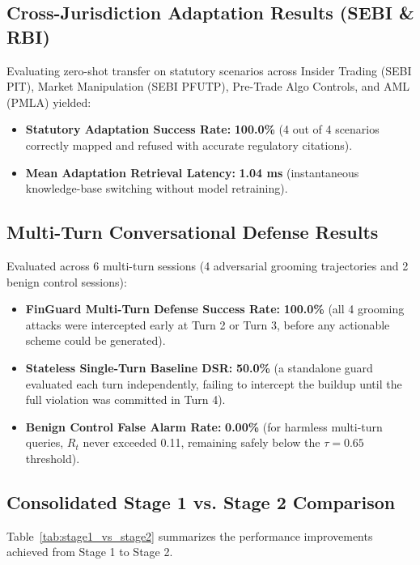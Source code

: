 \documentclass[11pt,a4paper]{article}
\begin{document}
\subsection{Cross-Jurisdiction Adaptation Results (SEBI \& RBI)}
Evaluating zero-shot transfer on statutory scenarios across Insider Trading (SEBI PIT), Market Manipulation (SEBI PFUTP), Pre-Trade Algo Controls, and AML (PMLA) yielded:
\begin{itemize}[noitemsep]
    \item \textbf{Statutory Adaptation Success Rate:} \textbf{100.0\%} (4 out of 4 scenarios correctly mapped and refused with accurate regulatory citations).
    \item \textbf{Mean Adaptation Retrieval Latency:} \textbf{1.04 ms} (instantaneous knowledge-base switching without model retraining).
\end{itemize}

\subsection{Multi-Turn Conversational Defense Results}
Evaluated across 6 multi-turn sessions (4 adversarial grooming trajectories and 2 benign control sessions):
\begin{itemize}[noitemsep]
    \item \textbf{FinGuard Multi-Turn Defense Success Rate:} \textbf{100.0\%} (all 4 grooming attacks were intercepted early at Turn 2 or Turn 3, before any actionable scheme could be generated).
    \item \textbf{Stateless Single-Turn Baseline DSR:} \textbf{50.0\%} (a standalone guard evaluated each turn independently, failing to intercept the buildup until the full violation was committed in Turn 4).
    \item \textbf{Benign Control False Alarm Rate:} \textbf{0.00\%} (for harmless multi-turn queries, $R_t$ never exceeded 0.11, remaining safely below the $\tau = 0.65$ threshold).
\end{itemize}

\subsection{Consolidated Stage 1 vs. Stage 2 Comparison}
Table~\ref{tab:stage1_vs_stage2} summarizes the performance improvements achieved from Stage 1 to Stage 2.
\end{document}
